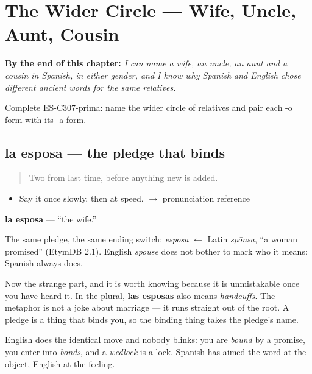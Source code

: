 
\chapter{The Wider Circle --- Wife, Uncle, Aunt, Cousin}
\label{ch:esposos-y-tios}

\begin{chapteropening}
\textbf{By the end of this chapter:} \emph{I can name a wife, an uncle, an aunt and a cousin in Spanish, in either gender, and I know why Spanish and English chose different ancient words for the same relatives.}

Complete ES-C307-prima: name the wider circle of relatives and pair each -o form with its -a form.
\end{chapteropening}

\section[la esposa]{la esposa --- the pledge that binds}

\label{lesson:ES-C307-esposa}



\begin{quote}
Two from last time, before anything new is added.
\end{quote}

\begin{sounds}
\begin{itemize}
\raggedright
  \item Say it once slowly, then at speed. $\to$ pronunciation reference
\end{itemize}
\end{sounds}

\begin{cousinweb}
\textbf{la esposa} --- \textquotedblleft{}the wife.\textquotedblright{}

The same pledge, the same ending switch: \emph{esposa} $\leftarrow$ Latin \emph{spōnsa}, \textquotedblleft{}a woman promised\textquotedblright{} (EtymDB 2.1). English \emph{spouse} does not bother to mark who it means; Spanish always does.

Now the strange part, and it is worth knowing because it is unmistakable once you have heard it. In the plural, \textbf{las esposas} also means \emph{handcuffs}. The metaphor is not a joke about marriage --- it runs straight out of the root. A pledge is a thing that binds you, so the binding thing takes the pledge's name.

English does the identical move and nobody blinks: you are \emph{bound} by a promise, you enter into \emph{bonds}, and a \emph{wedlock} is a lock. Spanish has aimed the word at the object, English at the feeling.
\end{cousinweb}

